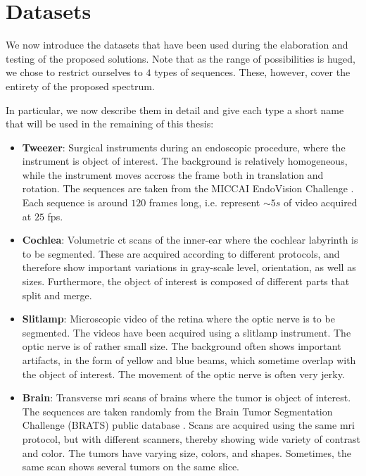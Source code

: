 \section{Datasets}

We now introduce the datasets that have been used during the elaboration and testing of the proposed solutions.
Note that as the range of possibilities is huged, we chose to restrict ourselves to $4$ types of sequences. These, however, cover the entirety of the proposed spectrum.

In particular, we now describe them in detail and give each type a short name that will be used in the remaining of this thesis:

\begin{itemize}
  \item \textbf{Tweezer}: Surgical instruments during an endoscopic procedure, where the instrument is object of interest.
    The background is relatively homogeneous, while the instrument moves accross the frame both in translation and rotation.
    The sequences are taken from the MICCAI EndoVision Challenge \cite{EndoChall}.
    Each sequence is around $120$ frames long, i.e. represent $\sim 5s$ of video acquired at $25$ fps.
  \item \textbf{Cochlea}: Volumetric \Gls{ct} scans of the inner-ear where the cochlear labyrinth is to be segmented. These are acquired according to different protocols, and therefore show important variations in gray-scale level, orientation, as well as sizes. Furthermore, the object of interest is composed of different parts that split and merge.
  \item \textbf{Slitlamp}: Microscopic video of the retina where the optic nerve is to be segmented. The videos have been acquired using a slitlamp instrument.
    The optic nerve is of rather small size. The background often shows important artifacts, in the form of yellow and blue beams, which sometime overlap with the object of interest. The movement of the optic nerve is often very jerky.
  \item \textbf{Brain}: Transverse \gls{mri} scans of brains where the tumor is object of interest. The sequences are taken randomly from the Brain Tumor Segmentation Challenge (BRATS) public database \cite{BRATSChall}.
    Scans are acquired using the same \gls{mri} protocol, but with different scanners, thereby showing wide variety of contrast and color.
    The tumors have varying size, colors, and shapes. Sometimes, the same scan shows several tumors on the same slice.

\end{itemize}

